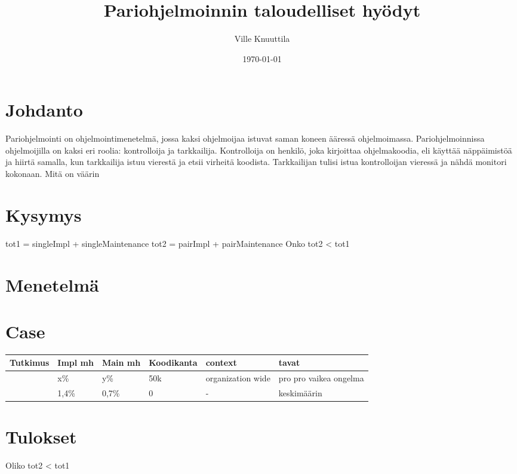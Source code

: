 \documentclass[finnish]{tktltiki2}
\title{Pariohjelmoinnin taloudelliset hyödyt}
\author{Ville Knuuttila}
\date{\today}
\theoremstyle{definition}
\theoremstyle{remark}
\begin{document}

\maketitle        %
\makeabstract     %

\tableofcontents  %
\newpage          %



\section{Johdanto}
Pariohjelmointi on ohjelmointimenetelmä, jossa kaksi ohjelmoijaa istuvat saman koneen ääressä ohjelmoimassa. Pariohjelmoinnissa ohjelmoijilla on kaksi eri roolia: kontrolloija ja tarkkailija. Kontrolloija on henkilö, joka kirjoittaa ohjelmakoodia, eli käyttää näppäimistöä ja hiirtä samalla, kun tarkkailija istuu vierestä ja etsii virheitä koodista. Tarkkailijan tulisi istua kontrolloijan vieressä ja nähdä monitori kokonaan. \cite{pairprogramming} 
\newline
Mitä on väärin~\cite{meta}

\section{Kysymys}
tot1 = singleImpl + singleMaintenance\newline
tot2 = pairImpl + pairMaintenance\newline
Onko tot2 < tot1
\section{Menetelmä}
\section{Case}
\begin{center}
    \begin{tabular}{ | l | l | l | l | l | p{4cm} |}
    \hline
    Tutkimus & Impl mh & Main mh & Koodikanta & context & tavat \\ \hline
    	\cite{case} & x\% & y\% & 50k & organization wide & pro pro vaikea ongelma \\ \hline
	\cite{costandbenefit} & 1,4\% & 0,7\% & 0 & - & keskimäärin \\ \hline
    \end{tabular}
\end{center}

\section{Tulokset}
Oliko tot2 < tot1

%
%
% 
%



\end{document}
